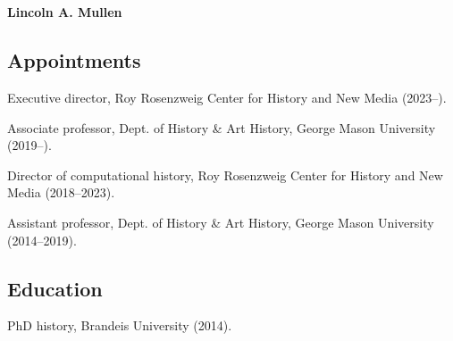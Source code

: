 \documentclass[11pt]{article}
\begin{document}
\thispagestyle{fancy}
\fancyfoot{}
\fancyhead{}
\renewcommand{\headrulewidth}{0pt}

\hfill\hfill\hfill
\hfill\hfill\hfill
\hfill\hfill\hfill
\hfill\hfill\hfill
\begin{minipage}[t]{2.2in}
   \\
   \\
\end{minipage}
\hfill
\begin{minipage}[t]{3.0in}
\end{minipage}

\vspace{0.4in}

{\Large\sffamily\bfseries Lincoln A. Mullen}\\[-0.1in]

\subsection{Appointments}\label{Appointments}

Executive director, Roy Rosenzweig Center for History and New Media (2023--).

Associate professor, Dept. of History \& Art History, George Mason University (2019--).

Director of computational history, Roy Rosenzweig Center for History and New 
Media (2018--2023).

Assistant professor, Dept. of History \& Art History, George Mason University (2014--2019).

\subsection{Education}\label{Education}

PhD history, Brandeis University (2014). 
\end{document}
